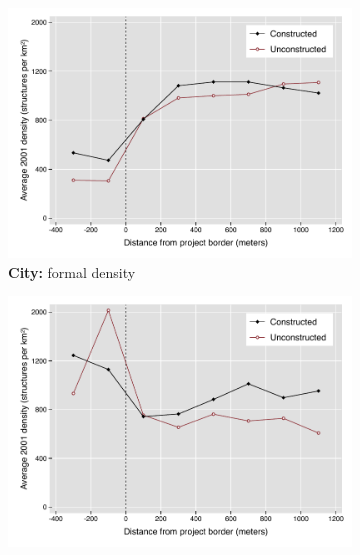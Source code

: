 \documentclass[12pt]{article}
\begin{document}
\begin{figure}[h!]
        \centering
        \caption[ Pre-Period Housing Densities in Constructed and Unconstructed Projects: City versus Suburb]
        {\small Pre-Period Housing Densities in Constructed and Unconstructed Projects: City versus Suburb} 
        \begin{subfigure}[b]{0.495\textwidth}
            \centering
            \includegraphics[width=\textwidth,trim={0.3cm .3cm 0.1cm 0cm}, clip=true]{figures/bblu_for_pre_means_het_near.pdf}
            \caption[Network2]%
            {{\small \textbf{City:} formal density}}    
            \label{fig:prefor_near_het}
        \end{subfigure}
        \hfill
        \begin{subfigure}[b]{0.495\textwidth}  
            \centering 
            \includegraphics[width=\textwidth,trim={0.3cm .3cm 0.1cm 0cm}, clip=true]{figures/bblu_inf_pre_means_het_near.pdf}

\end{subfigure}
\end{figure}
\end{document}
